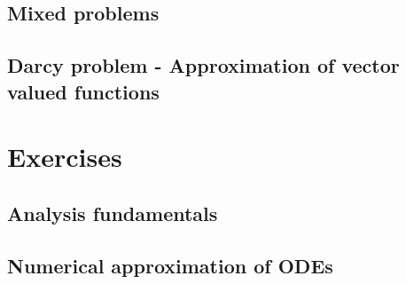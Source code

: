 \documentclass[palatino,twoside]{epflnotes}
\newif\ifincludefirstsemester
\begin{document}
\chapter{Mixed problems}
\ifincludefirstsemester\fi

\chapter{Darcy problem - Approximation of vector valued functions}
\ifincludefirstsemester\fi

\appendix
\part{Exercises}

\chapter{Analysis fundamentals}


\chapter{Numerical approximation of ODEs}


\backmatter


\printindex
\end{document}
